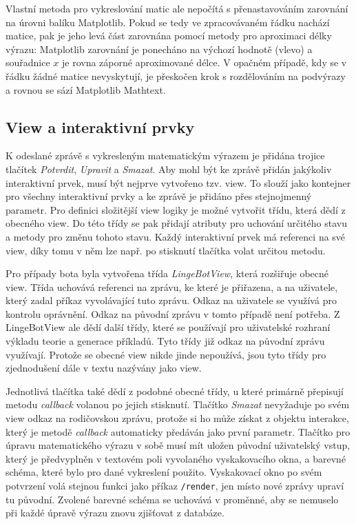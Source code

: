 \documentclass[FM]{tulthesis}
\begin{document}
	Vlastní metoda pro vykreslování matic ale nepočítá s přenastavováním zarovnání na úrovni balíku Matplotlib. Pokud se tedy ve zpracovávaném řádku nachází matice, pak je jeho levá část zarovnána pomocí metody pro aproximaci délky výrazu: Matplotlib zarovnání je ponecháno na výchozí hodnotě (vlevo) a souřadnice $x$ je rovna záporné aproximované délce. V opačném případě, kdy se v řádku žádné matice nevyskytují, je přeskočen krok s rozdělováním na podvýrazy a rovnou se sází Matplotlib Mathtext.
	
	\subsection{View a interaktivní prvky}
	
	K odeslané zprávě s vykresleným matematickým výrazem je přidána trojice tlačítek \textit{Potvrdit}, \textit{Upravit} a \textit{Smazat}. Aby mohl být ke zprávě přidán jakýkoliv interaktivní prvek, musí být nejprve vytvořeno tzv. view. To slouží jako kontejner pro všechny interaktivní prvky a ke zprávě je přidáno přes stejnojmenný parametr. Pro definici složitější view logiky je možné vytvořit třídu, která dědí z obecného view. Do této třídy se pak přidají atributy pro uchování určitého stavu a metody pro změnu tohoto stavu. Každý interaktivní prvek má referenci na své view, díky tomu v něm lze např. po stisknutí tlačítka volat určitou metodu.
	
	Pro případy bota byla vytvořena třída \textit{LingeBotView}, která rozšiřuje obecné view. Třída uchovává referenci na zprávu, ke které je přiřazena, a na uživatele, který zadal příkaz vyvolávající tuto zprávu. Odkaz na uživatele se využívá pro kontrolu oprávnění. Odkaz na původní zprávu v tomto případě není potřeba. Z \mbox{LingeBotView} ale dědí další třídy, které se používají pro uživatelské rozhraní výkladu teorie a generace příkladů. Tyto třídy již odkaz na původní zprávu využívají. Protože se obecné view nikde jinde nepoužívá, jsou tyto třídy pro zjednodušení dále v textu nazývány jako view. 
	
	Jednotlivá tlačítka také dědí z podobné obecné třídy, u které primárně přepisují metodu \textit{callback} volanou po jejich stisknutí. Tlačítko \textit{Smazat} nevyžaduje po svém view odkaz na rodičovskou zprávu, protože si ho může získat z objektu interakce, který je metodě \textit{callback} automaticky předáván jako první parametr. Tlačítko pro úpravu matematického výrazu v sobě musí mít uložen původní uživatelský vstup, který je předvyplněn v textovém poli vyvolaného vyskakovacího okna, a barevné schéma, které bylo pro dané vykreslení použito. Vyskakovací okno po svém potvrzení volá stejnou funkci jako příkaz \verb|/render|, jen místo nové zprávy upraví tu původní. Zvolené barevné schéma se uchovává v proměnné, aby se nemuselo při každé úpravě výrazu znovu zjišťovat z databáze.
			
\end{document}
